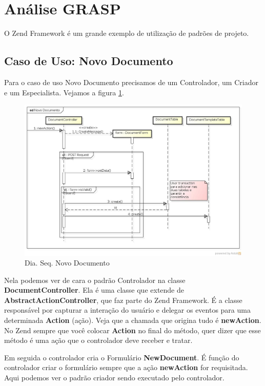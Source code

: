 \section{Análise GRASP}

O Zend Framework é um grande exemplo de utilização de padrões de
projeto.

\subsection{Caso de Uso: Novo Documento}

Para o caso de uso Novo Documento precisamos de um Controlador, um
Criador e um Especialista. Vejamos a figura
\ref{dia-seq-novo-documento}.

\begin{figure}[h]
    \includegraphics[scale=0.4]{img/DiagramaSequenciaNovoDocumento.jpg}
    \caption{Dia. Seq. Novo Documento}
    \label{dia-seq-novo-documento}
\end{figure}

Nela podemos ver de cara o padrão Controlador na classe
\textbf{DocumentController}. Ela é uma classe que extende de
\textbf{AbstractActionController}, que faz parte do Zend Framework. É a
classe responsável por capturar a interação do usuário e delegar os
eventos para uma determinada \textbf{Action} (ação). Veja que a chamada
que origina tudo é \textbf{newAction}. No Zend sempre que você colocar
\textbf{Action} no final do método, quer dizer que esse método é uma
ação que o controlador deve receber e tratar.

Em seguida o controlador cria o Formulário \textbf{NewDocument}. É
função do controlador criar o formulário sempre que a ação
\textbf{newAction} for requisitada. Aqui podemos ver o padrão criador
sendo executado pelo controlador.

